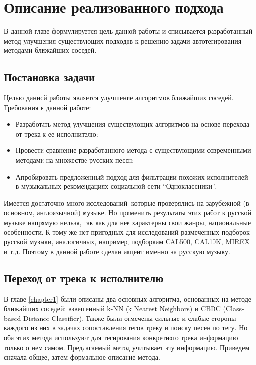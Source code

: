 \chapter{Описание реализованного подхода}
\label{chapter2}

В данной главе формулируется цель данной работы и описывается разработанный метод улучшения существующих подходов 
к решению задачи автотегирования методами ближайших соседей.

\section{Постановка задачи}
Целью данной работы является улучшение алгоритмов ближайших соседей. Требования к данной работе:
\begin{itemize}
 \item Разработать метод улучшения существующих алгоритмов на основе перехода от трека к ее исполнителю;
 \item Провести сравнение разработанного метода с существующими современными методами на множестве русских песен;
 \item Апробировать предложенный подход для фильтрации похожих исполнителей в музыкальных рекомендациях социальной сети ``Одноклассники''.
\end{itemize}

Имеется достаточно много исследований, которые проверялись на зарубежной (в основном, англоязычной) музыке. Но применить результаты этих работ к русской музыке напрямую нельзя, 
так как для нее характерны свои жанры, национальные особенности.
К тому же нет пригодных для исследований размеченных подборок русской музыки, аналогичных, например, подборкам CAL500, CAL10K, MIREX и т.д.
Поэтому в данной работе сделан акцент именно на русскую музыку.

\section{Переход от трека к исполнителю}

В главе \ref{chapter1} были описаны два основных алгоритма, основанных на методе ближайших соседей: взвешенный k-NN (k Nearest Neighbors) и CBDC (Class-based Distance Classifier).
Также были отмечены сильные и слабые стороны каждого из них в задачах сопоставления тегов треку и поиску песен по тегу. Но оба этих метода используют для тегирования конкретного трека
информацию только о нем самом. Предлагаемый метод учитывает эту информацию. Приведем сначала общее, затем формальное описание метода.

